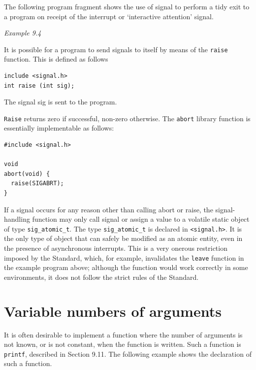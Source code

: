  The following program fragment shows the use  of  signal  to perform
   a tidy exit to a program on receipt of the interrupt or `interactive
   attention' signal.


  \begin{center}\textit{Example 9.4}\end{center}


  It is possible for a program to send signals  to  itself  by means of the
   \texttt{raise} function. This is defined as follows


  \begin{Verbatim}
include <signal.h>
int raise (int sig);
\end{Verbatim}

  The signal sig is sent to the program.


  \texttt{Raise} returns zero if successful, non-zero  otherwise.   The
   \texttt{abort}  library  function  is  essentially  implementable  as
   follows:


  \begin{Verbatim}
#include <signal.h>

void
abort(void) {
  raise(SIGABRT);
}
\end{Verbatim}

  If a signal occurs for any reason other than  calling  abort or  raise,
   the signal-handling function may only call signal or assign a value  to
   a  volatile  static  object  of  type \texttt{sig\_atomic\_t}.    The type
   \texttt{sig\_atomic\_t}  is  declared  in \texttt{<signal.h>}.
   It is the only type of object that  can safely be  modified  as  an  atomic
   entity, even in the presence of asynchronous interrupts.  This is a very
   onerous restriction imposed by the Standard, which, for example, invalidates
   the \texttt{leave} function in the example program  above;  although
   the function  would work correctly in some environments, it does not follow
   the strict rules of the Standard.


 
        \section{Variable numbers of arguments}
        

  

  It is often desirable to implement a function where the number of
   arguments is not known, or is not constant, when the function is written.
   Such a function is \texttt{printf}, described in Section 9.11.  The following example shows the declaration of such
   a function.


